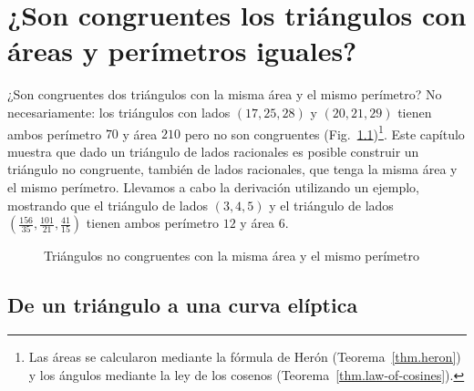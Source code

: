 
\chapter{¿Son congruentes los triángulos con áreas y perímetros iguales?}\label{c.congruent}


¿Son congruentes dos triángulos con la misma área y el mismo perímetro? No necesariamente: los triángulos con lados $(17,25,28)$ y $(20,21,29)$ tienen ambos perímetro $70$ y área $210$ pero no son congruentes (Fig.~\ref{f.congruent-first-example})\footnote{Las áreas se calcularon mediante la fórmula de Herón (Teorema~\ref{thm.heron}) y los ángulos mediante la ley de los cosenos (Teorema~\ref{thm.law-of-cosines}).}. Este capítulo muestra que dado un triángulo de lados racionales es posible construir un triángulo no congruente, también de lados racionales, que tenga la misma área y el mismo perímetro.
Llevamos a cabo la derivación utilizando un ejemplo, mostrando que el triángulo de lados $(3,4,5)$ y el triángulo de lados 
$\left(\frac{156}{35}, \frac{101}{21}, \frac{41}{15}\right)$ tienen ambos perímetro $12$ y área $6$.

\begin{figure}[b]
\begin{center}
\end{center}
\caption{Triángulos no congruentes con la misma área y el mismo perímetro}\label{f.congruent-first-example}
\end{figure}

\section{De un triángulo a una curva elíptica}\label{s.elliptic}

